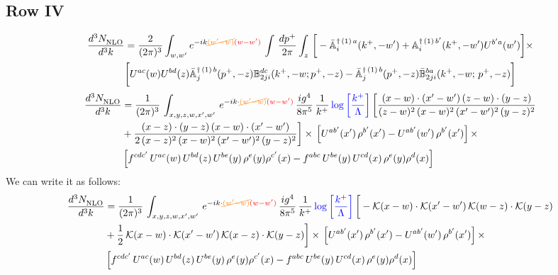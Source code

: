 \documentclass[9pt]{article}
\def\mf#1{\mathbb{#1}}
\numberwithin{equation}{section}
\begin{document}
\subsection{Row IV}
\begin{align}
 \frac{d^{3}N_{\rm NLO}^{\rm}}{d^{3}k}  & = \frac{2}{(2\pi)^{3}}  \int_{w, w^\prime} e^{-ik{\color{orange}\cancel{(w^\prime-w)}}{\color{red}(w-w^\prime)}}\, \int\,\frac{dp^{+}}{2\pi} \int_{z}\,\bigg[-\bar{\mf{A}}^{\dagger\,(1)\,a}_{i}(k^{+},-w^{\prime})+\mf{A}^{\dagger\, (1)\, b^{\prime}}_{i}(k^{+},-w^{\prime})U^{b^{\prime}a}(w^{\prime})\bigg]\times \notag \\ & \bigg[U^{ac}(w)U^{bd}(z) \bar{\mf{A}}^{\dagger\, (1)\, b}_{j}(p^+,- z) {\mf{B}}^{dc}_{2ji} (k^+, -w;p^+, -z) - \Bar{\mf{A}}^{\dagger\, (1)\, b}_{j}(p^{+}, -z)\Bar{\mf{B}}^{ba}_{2ji}(k^{+},-w;\,p^{+}, -z) \bigg] \nonumber
\end{align}
\begin{align}
    \frac{d^{3}N_{\rm NLO}^{\rm}}{d^{3}k}  & =  \frac{1}{(2\pi)^{3}}\,
    \int_{x,y,z,w,x',w'}\,e^{-ik\cdot {\color{orange}\cancel{(w^\prime-w)}}{\color{red}(w-w^\prime)}}\, \frac{ig^{4}}{8\pi^{5}}\,\frac{1}{k^{+}}\,{\color{blue}\log{\left[\frac{k^{+}}{\Lambda}\right]}}\,\bigg[\frac{(x-w)\cdot (x'-w')\,(z-w)\cdot (y-z)}{(z-w)^{2}\,(x-w)^{2}\,(x'-w')^{2}\,(y-z)^{2}}\notag \\ & +\frac{(x-z)\cdot (y-z)\,(x-w)\cdot (x'-w')}{2\, (x-z)^{2}\,(x-w)^{2}\,(x'-w')^{2}\,(y-z)^{2}}\bigg]\times\,\left[U^{ab'}(x')\,\rho^{b'}(x')-U^{ab'}(w')\,\rho^{b'}(x')\right]\times\notag \\ &  \left[f^{cdc'}\,U^{ac}(w)\,U^{bd}(z)\,U^{be}(y)\,\rho^{e}(y)\rho^{c'}(x)-f^{abc}\,U^{be}(y)\,U^{cd}(x)\,\rho^{e}(y)\rho^{d}(x)\right]
\end{align}
We can write it as follows:
\begin{align}
    \frac{d^{3}N_{\rm NLO}^{\rm}}{d^{3}k}  & =  \frac{1}{(2\pi)^{3}}\,
    \int_{x,y,z,w,x',w'}\,e^{-ik\cdot {\color{orange}\cancel{(w^\prime-w)}}{\color{red}(w-w^\prime)}}\, \frac{ig^{4}}{8\pi^{5}}\,\frac{1}{k^{+}}\,{\color{blue}\log{\left[\frac{k^{+}}{\Lambda}\right]}}\,\bigg[-\mathcal{K}(x-w)\cdot \mathcal{K}(x'-w')\, \mathcal{K}(w-z)\cdot \mathcal{K}(y-z)\notag \\ & +\frac{1}{2}\,\mathcal{K}(x-w)\cdot \mathcal{K}(x'-w')\, \mathcal{K}(x-z)\cdot \mathcal{K}(y-z)\bigg]\times\,\left[U^{ab'}(x')\,\rho^{b'}(x')-U^{ab'}(w')\,\rho^{b'}(x')\right]\times\notag \\ &  \left[f^{cdc'}\,U^{ac}(w)\,U^{bd}(z)\,U^{be}(y)\,\rho^{e}(y)\rho^{c'}(x)-f^{abc}\,U^{be}(y)\,U^{cd}(x)\,\rho^{e}(y)\rho^{d}(x)\right]
\end{align}
\end{document}

